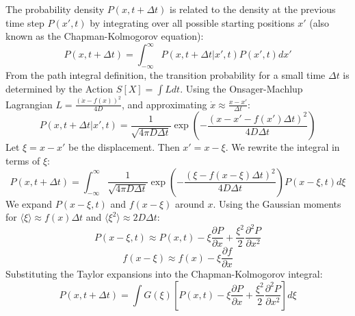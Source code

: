 \documentclass[12pt]{article}
\begin{document}
\begin{singlespace}
The probability density $P(x, t+\Delta t)$ is related to the density at the previous time step $P(x', t)$ by integrating over all possible starting positions $x'$ (also known as the Chapman-Kolmogorov equation):
\begin{equation}
P(x, t+\Delta t) = \int_{-\infty}^{\infty} P(x, t+\Delta t | x', t) P(x', t) dx'
\end{equation}
From the path integral definition, the transition probability for a small time $\Delta t$ is determined by the Action $S[X] = \int L dt$. Using the Onsager-Machlup Lagrangian $L = \frac{(\dot{x}-f(x))^2}{4D}$, and approximating $\dot{x} \approx \frac{x-x'}{\Delta t}$:
\begin{equation}
P(x, t+\Delta t | x', t) = \frac{1}{\sqrt{4\pi D \Delta t}} \exp\left( -\frac{(x - x' - f(x')\Delta t)^2}{4D\Delta t} \right)
\end{equation}
Let $\xi = x - x'$ be the displacement. Then $x' = x - \xi$. We rewrite the integral in terms of $\xi$:
\begin{equation}
P(x, t+\Delta t) = \int_{-\infty}^{\infty} \frac{1}{\sqrt{4\pi D \Delta t}} \exp\left( -\frac{(\xi - f(x-\xi)\Delta t)^2}{4D\Delta t} \right) P(x-\xi, t) d\xi
\end{equation}
We expand $P(x-\xi, t)$ and $f(x-\xi)$ around $x$. Using the Gaussian moments for $\langle \xi \rangle \approx f(x)\Delta t$ and $\langle \xi^2 \rangle \approx 2D\Delta t$:
\begin{equation}
P(x-\xi, t) \approx P(x, t) - \xi \frac{\partial P}{\partial x} + \frac{\xi^2}{2} \frac{\partial^2 P}{\partial x^2}
\end{equation}
\begin{equation}
f(x-\xi) \approx f(x) - \xi \frac{\partial f}{\partial x}
\end{equation}
Substituting the Taylor expansions into the Chapman-Kolmogorov integral:
\begin{equation}
P(x, t+\Delta t) = \int G(\xi) \left[ P(x,t) - \xi \frac{\partial P}{\partial x} + \frac{\xi^2}{2} \frac{\partial^2 P}{\partial x^2} \right] d\xi
\end{equation}


\end{singlespace}
\end{document}
